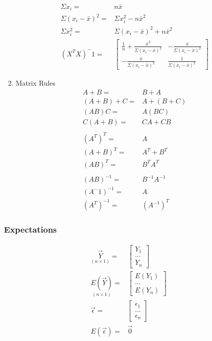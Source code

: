 \documentclass[11pt]{article}
\begin{document}
\begin{enumerate}
\begin{equation}
\begin{split}
\Sigma x_i = & n \bar{x}\\
\Sigma (x_i - \bar{x})^2 = & \Sigma x_i^2 - n \bar{x}^2\\
\Sigma x_i^2 = & \Sigma (x_i - \bar{x})^2 + n \bar{x}^2\\
(X^T X)^-1 = & \begin{bmatrix}
\frac{1}{n} + \frac{\bar{x}^2}{\Sigma (x_i - \bar{x})^2} & - \frac{\bar{x}}{\Sigma (x_i - \bar{x})^2}\\
- \frac{\bar{x}}{\Sigma (x_i - \bar{x})^2} & \frac{1}{\Sigma (x_i - \bar{x})^2}
\end{bmatrix}
\end{split}
\end{equation}
\item Matrix Rules
\label{sec:orgd68dbfc}
\begin{equation}
\begin{split}
A + B = & B + A\\
(A + B) + C = & A + (B + C)\\
(AB)C = & A(BC)\\
C(A + B) = & CA + CB\\
\\
(A^T)^T = & A\\
(A + B)^T = & A^T + B^T\\
(AB)^T = & B^T A^T\\
\\
(AB)^{-1} = & B^{-1} A^{-1}\\
(A^-1)^{-1} = & A\\
(A^T)^{-1} = & (A^{-1})^T
\end{split}
\end{equation}
\end{enumerate}

\subsubsection{Expectations}
\label{sec:orgd10446d}
\begin{equation}
\begin{split}
\underset{(n \times 1)}{\vec{Y}} = & \begin{bmatrix}
Y_1\\
...\\
Y_n
\end{bmatrix}\\
\underset{(n \times 1)}{E(\vec{Y})} = & \begin{bmatrix}
E(Y_1)\\
...\\
E(Y_n)
\end{bmatrix}\\
\vec{\epsilon} = & \begin{bmatrix}
\epsilon_1\\
...\\
\epsilon_n
\end{bmatrix}\\
E(\vec{\epsilon}) = & \vec{0}
\end{split}
\end{equation}
\end{document}
